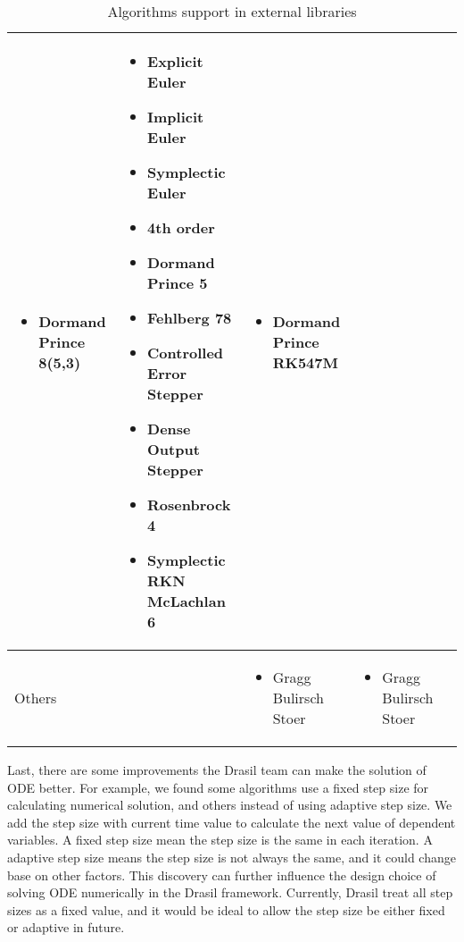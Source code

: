 \begin{sidewaystable}
\begin{adjustbox}{width=\columnwidth,center}
\begin{tabular}{p{} | p{} p{} p{} p{}}
\begin{itemize}[wide]
        \item Dormand Prince 8(5,3) 
        \end{itemize} & 
        \begin{itemize}[wide]
        \item Explicit Euler
        \item Implicit Euler
        \item Symplectic Euler
        \item 4th order
        \item Dormand Prince 5
        \item Fehlberg 78
        \item Controlled Error Stepper
        \item Dense Output Stepper
        \item Rosenbrock 4
        \item Symplectic RKN McLachlan 6
        \end{itemize} & 
        \begin{itemize}[wide]
        \item Dormand Prince RK547M
        \end{itemize} \\ \hline
    Others && 
        \begin{itemize}[wide]
        \item Gragg Bulirsch Stoer 
        \end{itemize} & 
        \begin{itemize}[wide]
        \item Gragg Bulirsch Stoer 
        \end{itemize} &\\
    \bottomrule	
\end{tabular}
\end{adjustbox}
\caption{Algorithms support in external libraries}	
\label{tab_algoexlib}
\end{sidewaystable}

Last, there are some improvements the Drasil team can make the solution of ODE better. For example, we found some algorithms use a fixed step size for calculating numerical solution, and others instead of using adaptive step size. We add the step size with current time value to calculate the next value of dependent variables. A fixed step size mean the step size is the same in each iteration. A adaptive step size means the step size is not always the same, and it could change base on other factors. This discovery can further influence the design choice of solving ODE numerically in the Drasil framework. Currently, Drasil treat all step sizes as a fixed value, and it would be ideal to allow the step size be either fixed or adaptive in future.

